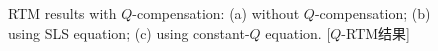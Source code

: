 \begin{figure}[!htbp]
	    \centering
		{RTM results with $Q$-compensation: (a) without $Q$-compensation; (b) using SLS 
		equation; (c) using constant-$Q$ equation.
		}[$Q$-RTM结果]
		\label{fig:qrtm}
\end{figure}
